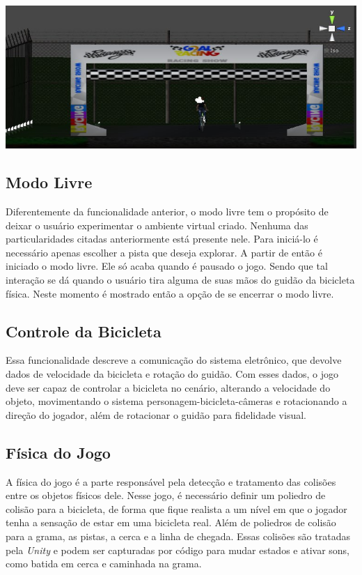 \begin{center}
	\includegraphics[scale=0.4]{figuras/linhadechegada}
	\label{figura:linhadechegada}
\end{center}

\subsection{Modo Livre}
\label{livre}
Diferentemente da funcionalidade anterior, o modo livre tem o propósito de deixar o usuário experimentar o ambiente virtual criado. Nenhuma das particularidades citadas anteriormente está presente nele. Para iniciá-lo é necessário apenas escolher a pista que deseja explorar. A partir de então é iniciado o modo livre. Ele só acaba quando é pausado o jogo. Sendo que tal interação se dá quando o usuário tira alguma de suas mãos do guidão da bicicleta física. Neste momento é mostrado então a opção de se encerrar o modo livre.

\subsection{Controle da Bicicleta}
Essa funcionalidade descreve a comunicação do sistema eletrônico, que devolve dados de velocidade da bicicleta e rotação do guidão. Com esses dados, o jogo deve ser capaz de controlar a bicicleta no cenário, alterando a velocidade do objeto, movimentando o sistema personagem-bicicleta-câmeras e rotacionando a direção do jogador, além de rotacionar o guidão para fidelidade visual.

\subsection{Física do Jogo}
A física do jogo é a parte responsável pela detecção e tratamento das colisões entre os objetos físicos dele. Nesse jogo, é necessário definir um poliedro de colisão para a bicicleta, de forma que fique realista a um nível em que o jogador tenha a sensação de estar em uma bicicleta real. Além de poliedros de colisão para a grama, as pistas, a cerca e a linha de chegada. Essas colisões são tratadas pela \textit{Unity} e podem ser capturadas por código para mudar estados e ativar sons, como batida em cerca e caminhada na grama.

